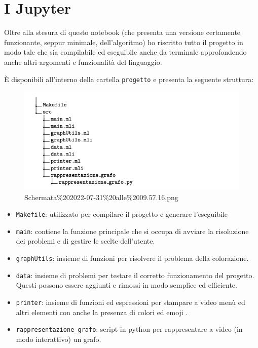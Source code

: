 \documentclass[11pt]{article}
\providecommand{\tightlist}{%
      \setlength{\itemsep}{0pt}\setlength{\parskip}{0pt}}
\begin{document}
\section{\texorpdfstring{I  Jupyter
}{I  Jupyter }}\label{i-jupyter}

    Oltre alla stesura di questo notebook (che presenta una versione
certamente funzionante, seppur minimale, dell'algoritmo) ho riscritto
tutto il progetto in modo tale che sia compilabile ed eseguibile anche
da terminale approfondendo anche altri argomenti e funzionalità del
linguaggio.

È disponibili all'interno della cartella \texttt{progetto} e presenta la
seguente struttura:

    \begin{figure}
\centering
\includegraphics{Colored Camel_files/struttura.png}
\caption{Schermata\%202022-07-31\%20alle\%2009.57.16.png}
\end{figure}

    \begin{itemize}
\tightlist
\item
  \texttt{Makefile}: utilizzato per compilare il progetto e generare
  l'eseguibile
\item
  \texttt{main}: contiene la funzione principale che si occupa di
  avviare la risoluzione dei problemi e di gestire le scelte
  dell'utente.
\item
  \texttt{graphUtils}: insieme di funzioni per risolvere il problema
  della colorazione.
\item
  \texttt{data}: insieme di problemi per testare il corretto
  funzionamento del progetto. Questi possono essere aggiunti e rimossi
  in modo semplice ed efficiente.
\item
  \texttt{printer}: insieme di funzioni ed espressioni per stampare a
  video menù ed altri elementi con anche la presenza di colori ed emoji
  .
\item
  \texttt{rappresentazione\_grafo}: script in python per rappresentare a
  video (in modo interattivo) un grafo.
\end{itemize}
\end{document}
